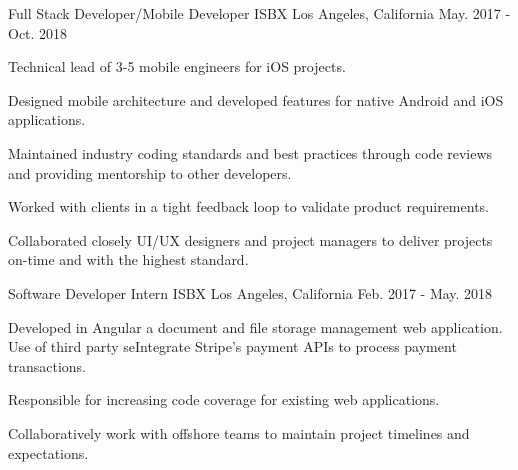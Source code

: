 \begin{cventries}
  \cventry
    {Full Stack Developer/Mobile Developer} %
    {ISBX} %
    {Los Angeles, California} %
    {May. 2017 - Oct. 2018} %
    {
      \begin{cvitems} %
        \item {Technical lead of 3-5 mobile engineers for iOS projects.}
        \item {Designed mobile architecture and developed features for native Android and iOS applications.}
        \item {Maintained industry coding standards and best practices through code reviews and providing mentorship to other developers.}
        \item {Worked with clients in a tight feedback loop to validate product requirements.}
        \item {Collaborated closely UI/UX designers and project managers to deliver projects on-time and with the highest standard.}
      \end{cvitems}
    }

  \cventry
    {Software Developer Intern} %
    {ISBX} %
    {Los Angeles, California} %
    {Feb. 2017 - May. 2018} %
    {
      \begin{cvitems} %
        \item {Developed in Angular a document and file storage management web application. Use of third party seIntegrate Stripe's payment APIs to process payment transactions.}
        \item {Responsible for increasing code coverage for existing web applications. }
        \item {Collaboratively work with offshore teams to maintain project timelines and expectations.}
      \end{cvitems}
    }

\end{cventries}
